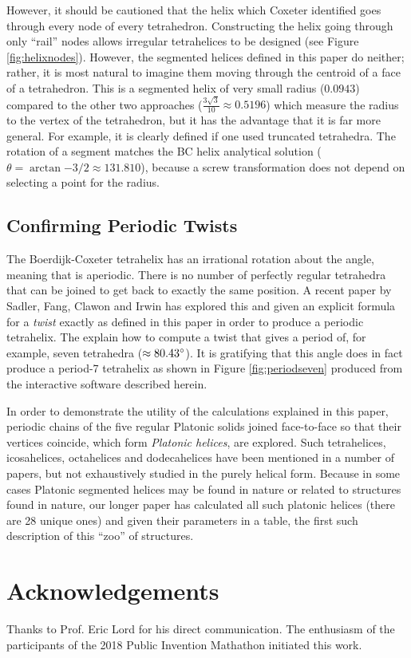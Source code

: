 \documentclass{svproc}
\begin{document}
However, it should be cautioned that the helix which Coxeter identified\cite{coxeter1985simplicial}
goes through every node of every tetrahedron. Constructing the helix going
through only ``rail'' nodes allows irregular tetrahelices to be designed\cite{read2018transforming}
(see Figure \ref{fig:helixnodes}).
However, the segmented helices defined in this paper do neither; rather, it is most natural to
imagine them moving through the centroid of a face of a tetrahedron.
This is a segmented helix of
very small radius ($0.0943$) compared to the other two approaches
($\frac{3\sqrt{3}}{10} \approx 0.5196$) which measure the radius to the
vertex of the tetrahedron, but it has
the advantage that it is far more general. For example, it is
clearly defined if one used truncated tetrahedra.
The rotation of a
segment matches the BC helix analytical solution
($\theta = \arctan{-3/2} \approx 131.810$),
because a screw transformation does not depend on selecting a point for the radius.



\subsection{Confirming Periodic Twists}

The Boerdijk-Coxeter tetrahelix has an irrational rotation about the angle,
meaning that is aperiodic.
There is no number of perfectly regular tetrahedra that can be joined to get back to exactly
the same position.
A recent paper by Sadler, Fang, Clawon and Irwin\cite{sadler2019periodic} has explored this
and given an explicit formula for a {\em twist} exactly as defined in this
paper in order to produce a periodic tetrahelix. The explain how to compute a twist
that gives a period of, for example, seven tetrahedra ($\approx 80.43 \degree$). It is gratifying that this angle does
in fact produce a period-7 tetrahelix as shown in Figure \ref{fig:periodseven} produced from
the interactive software described herein.

In order to demonstrate the utility of the calculations explained in this paper,
periodic chains of the five regular Platonic solids joined face-to-face so that their vertices coincide,
which form {\em Platonic helices}, are explored.
Such tetrahelices, icosahelices, octahelices and dodecahelices
have been mentioned in a number of papers\cite{elgersma2016quadrahelix,babiker2012combinatorial,lord2001sphere}, but not exhaustively studied in
the purely helical form.
Because in some cases Platonic segmented helices may be found in nature or
related to structures found in nature\cite{lord2004gamma,pearce1990structure},
our longer paper\cite{readfullsegmentedhelix} has calculated all such platonic helices (there are 28 unique ones) and given
their parameters in a table, the first such description of this ``zoo'' of structures.


\section{Acknowledgements}

Thanks to Prof. Eric Lord for his direct communication.
The enthusiasm of the participants of the 2018 Public Invention Mathathon
initiated this work.




\appendix
\end{document}

